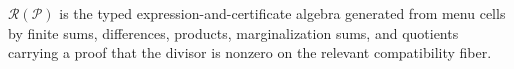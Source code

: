 \(\mathscr R(\mathcal P)\) is the typed expression-and-certificate algebra generated from menu cells by finite sums, differences, products, marginalization sums, and quotients carrying a proof that the divisor is nonzero on the relevant compatibility fiber.